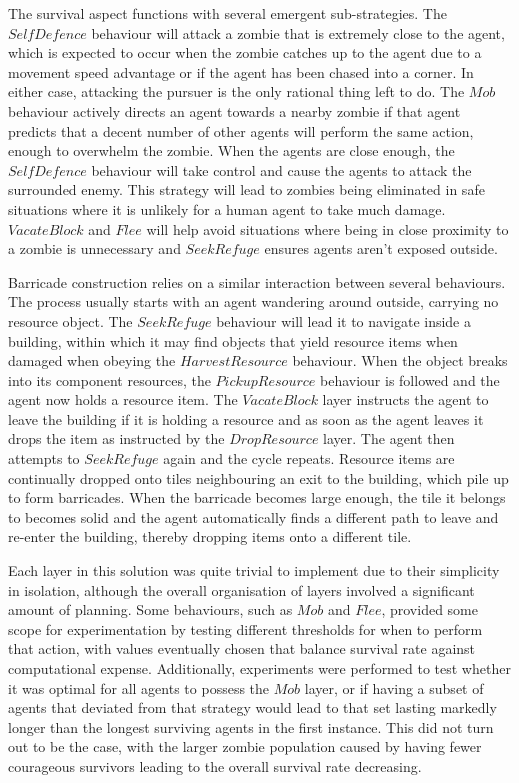 \documentclass[a4paper,12pt]{article}
\begin{document}
The survival aspect functions with several emergent sub-strategies. The $SelfDefence$ behaviour will attack a zombie that is extremely close to the agent, which is expected to occur when the zombie catches up to the agent due to a movement speed advantage or if the agent has been chased into a corner. In either case, attacking the pursuer is the only rational thing left to do. The $Mob$ behaviour actively directs an agent towards a nearby zombie if that agent predicts that a decent number of other agents will perform the same action, enough to overwhelm the zombie. When the agents are close enough, the $SelfDefence$ behaviour will take control and cause the agents to attack the surrounded enemy. This strategy will lead to zombies being eliminated in safe situations where it is unlikely for a human agent to take much damage. $VacateBlock$ and $Flee$ will help avoid situations where being in close proximity to a zombie is unnecessary and $SeekRefuge$ ensures agents aren't exposed outside.

Barricade construction relies on a similar interaction between several behaviours. The process usually starts with an agent wandering around outside, carrying no resource object. The $SeekRefuge$ behaviour will lead it to navigate inside a building, within which it may find objects that yield resource items when damaged when obeying the $HarvestResource$ behaviour. When the object breaks into its component resources, the $PickupResource$ behaviour is followed and the agent now holds a resource item. The $VacateBlock$ layer instructs the agent to leave the building if it is holding a resource and as soon as the agent leaves it drops the item as instructed by the $DropResource$ layer. The agent then attempts to $SeekRefuge$ again and the cycle repeats. Resource items are continually dropped onto tiles neighbouring an exit to the building, which pile up to form barricades. When the barricade becomes large enough, the tile it belongs to becomes solid and the agent automatically finds a different path to leave and re-enter the building, thereby dropping items onto a different tile.

Each layer in this solution was quite trivial to implement due to their simplicity in isolation, although the overall organisation of layers involved a significant amount of planning. Some behaviours, such as $Mob$ and $Flee$, provided some scope for experimentation by testing different thresholds for when to perform that action, with values eventually chosen that balance survival rate against computational expense. Additionally, experiments were performed to test whether it was optimal for all agents to possess the $Mob$ layer, or if having a subset of agents that deviated from that strategy would lead to that set lasting markedly longer than the longest surviving agents in the first instance. This did not turn out to be the case, with the larger zombie population caused by having fewer courageous survivors leading to the overall survival rate decreasing.
\end{document}

